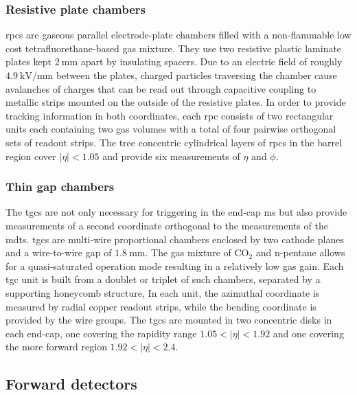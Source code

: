 \subsubsection{Resistive plate chambers}

\glspl{rpc} are gaseous parallel electrode-plate chambers filled with a non-flammable low cost tetrafluorethane-based gas mixture. They use two resistive plastic laminate plates kept $\SI{2}{\milli\meter}$ apart by insulating spacers. Due to an electric field of roughly $\SI{4.9}{\kilo\volt\per\milli\meter}$ between the plates, charged particles traversing the chamber cause avalanches of charges that can be read out through capacitive coupling to metallic strips mounted on the outside of the resistive plates. In order to provide tracking information in both coordinates, each \gls{rpc} consists of two rectangular units each containing two gas volumes with a total of four pairwise orthogonal sets of readout strips. The tree concentric cylindrical layers of \glspl{rpc} in the barrel region cover $\vert\eta\vert <1.05$ and provide six measurements of $\eta$ and $\phi$. %

\subsubsection{Thin gap chambers}

The \glspl{tgc} are not only necessary for triggering in the end-cap \gls{ms} but also provide measurements of a second coordinate orthogonal to the measurements of the \glspl{mdt}. \glspl{tgc} are multi-wire proportional chambers enclosed by two cathode planes and a wire-to-wire gap of $\SI{1.8}{\milli\meter}$. The gas mixture of CO$_2$ and n-pentane allows for a quasi-saturated operation mode resulting in a relatively low gas gain. Each \gls{tgc} unit is built from a doublet or triplet of such chambers, separated by a supporting honeycomb structure, In each unit, the azimuthal coordinate is measured by radial copper readout strips, while the bending coordinate is provided by the wire groups. The \glspl{tgc} are mounted in two concentric disks in each end-cap, one covering the rapidity range $1.05 < \vert\eta\vert < 1.92$ and one covering the more forward region $1.92 < \vert\eta\vert <2.4$. 

\subsection{Forward detectors}

